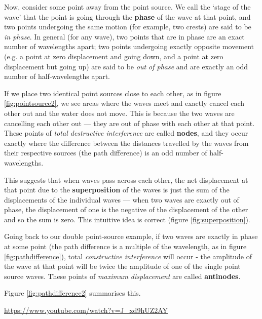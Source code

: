 \documentclass[a4paper]{amsbook}
\begin{document}
Now, consider some point away from the point source. We call the `stage of the wave' that the point is going through the \textbf{phase} of
the wave at that point, and two points undergoing the same motion (for example, two crests) are said to be \textit{in phase}.
In general (for any wave), two points that are in phase are an exact number of wavelengths apart; two points undergoing exactly opposite
movement (e.g. a point at zero displacement and going down, and a point at zero displacement but going up) are said to be \textit{out of phase}
and are exactly an odd number of half-wavelengths apart.

If we place two identical point sources close to each other, as in figure \ref{fig:pointsource2}, we see areas where the waves meet and exactly cancel
each other out and the water does not move. This is because the two waves are cancelling each other out --- they are out of phase with each other at
that point. These points of \textit{total destructive interference} are called \textbf{nodes}, and they occur exactly where the difference between the
distances travelled by the waves from their respective sources (the path difference) is an odd number of half-wavelengths.

This suggests that when waves pass across each other, the net displacement at that point due to the \textbf{superposition} of the waves is just the sum
of the displacements of the individual waves --- when two waves are exactly out of phase, the displacement of one is the negative of the displacement
of the other and so the sum is zero. This intuitive idea is correct (figure \ref{fig:superposition}).

Going back to our double point-source example, if two waves are exactly in phase at some point (the path difference is a multiple of the wavelength, as
in figure \ref{fig:pathdifference}), total \textit{constructive interference} will occur - the amplitude of the wave at that point will be twice
the amplitude of one of the single point source waves. These points of \textit{maximum displacement} are called \textbf{antinodes}.

Figure \ref{fig:pathdifference2} summarises this.

\begin{center}
\begin{tcolorbox}[width=0.8\textwidth,colback={red},title={\textbf{Go and watch...}},colbacktitle=yellow,coltitle=blue]
  \textcolor{white}{\url{https://www.youtube.com/watch?v=J_xd9hUZ2AY}}
\end{tcolorbox}
\end{center}
\end{document}
